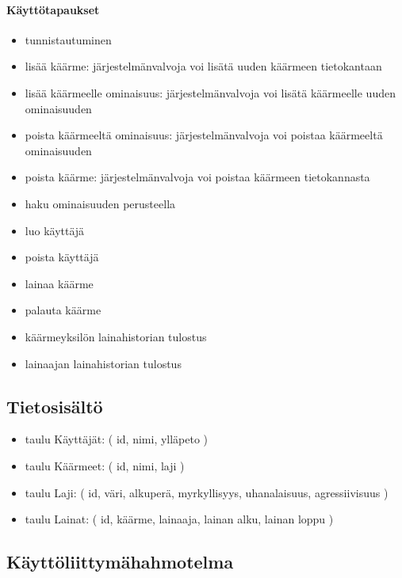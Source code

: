 \documentclass[11pt]{article}
\begin{document}
\paragraph{Käyttötapaukset} %

\begin{itemize}
\item tunnistautuminen
\item lisää käärme: järjestelmänvalvoja voi lisätä uuden käärmeen tietokantaan
\item lisää käärmeelle ominaisuus: järjestelmänvalvoja voi lisätä käärmeelle uuden ominaisuuden
\item poista käärmeeltä ominaisuus: järjestelmänvalvoja voi poistaa käärmeeltä ominaisuuden
\item poista käärme: järjestelmänvalvoja voi poistaa käärmeen tietokannasta
\item haku ominaisuuden perusteella
\item luo käyttäjä
\item poista käyttäjä
\item lainaa käärme
\item palauta käärme
\item käärmeyksilön lainahistorian tulostus
\item lainaajan lainahistorian tulostus
\end{itemize}

\subsection{Tietosisältö} %

\begin{itemize}
\item taulu Käyttäjät: ( id, nimi, ylläpeto )
\item taulu Käärmeet: ( id, nimi, laji )
\item taulu Laji: ( id, väri, alkuperä, myrkyllisyys, uhanalaisuus, agressiivisuus )
\item taulu Lainat: ( id, käärme, lainaaja, lainan alku, lainan loppu )
\end{itemize}

\subsection{Käyttöliittymähahmotelma} %
\end{document}
